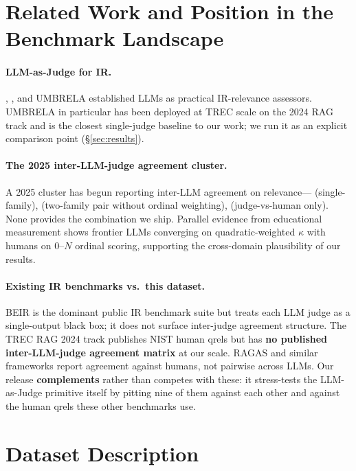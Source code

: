 \documentclass{article}
\begin{document}
\section{Related Work and Position in the Benchmark Landscape}

\paragraph{LLM-as-Judge for IR.} \citet{faggioli2023perspectives}, \citet{rahmani2024judges}, and UMBRELA \citep{upadhyay2024umbrela} established LLMs as practical IR-relevance assessors. UMBRELA in particular has been deployed at TREC scale on the 2024 RAG track and is the closest single-judge baseline to our work; we run it as an explicit comparison point (\S\ref{sec:results}).

\paragraph{The 2025 inter-LLM-judge agreement cluster.} A 2025 cluster has begun reporting inter-LLM agreement on relevance---\citet{balog2025rankersjudges} (single-family), \citet{thakur2025trecragsupport} (two-family pair without ordinal weighting), \citet{han2025judgesverdict} (judge-vs-human only). None provides the combination we ship. Parallel evidence from educational measurement \citep{jiao2026essayraters} shows frontier LLMs converging on quadratic-weighted $\kappa$ with humans on 0--$N$ ordinal scoring, supporting the cross-domain plausibility of our results.

\paragraph{Existing IR benchmarks vs.\ this dataset.} BEIR \citep{thakur2021beir} is the dominant public IR benchmark suite but treats each LLM judge as a single-output black box; it does not surface inter-judge agreement structure. The TREC RAG 2024 track \citep{macavaney2025trec_rag} publishes NIST human qrels but has \textbf{no published inter-LLM-judge agreement matrix} at our scale. RAGAS \citep{es2024ragas} and similar frameworks report agreement against humans, not pairwise across LLMs. Our release \textbf{complements} rather than competes with these: it stress-tests the LLM-as-Judge primitive itself by pitting nine of them against each other and against the human qrels these other benchmarks use.

\section{Dataset Description}
\end{document}
